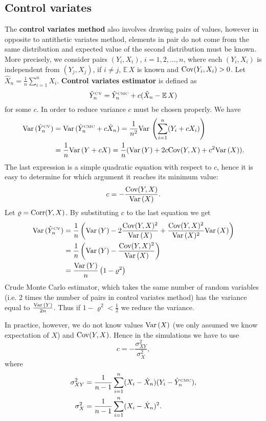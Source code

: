 \documentclass[a4paper,12pt, oneside]{book}
\theoremstyle{definition}
\theoremstyle{remark}
\def\Var{{\rm Var}\,}
\def\E{{\mathbb{E}}\,}
\def\Cov{{\hbox{Cov}}}
\def\Corr{{\hbox{Corr}}}
\def\CMC[#1]{\hat{Y}^{\hbox{\tiny CMC}}_{#1}}
\def\CV[#1]{\hat{Y}^{\hbox{\tiny CV}}_{#1}}
\begin{document}
\subsection{Control variates}
The \textbf{control variates method} also involves drawing pairs of values, however in opposite to antithetic variates method, elements in pair do not come from the same distribution and expected value of the second distribution must be known. More precisely, we consider pairs $(Y_i, X_i)$, $i=1,2,...,n$, where each $(Y_i, X_i)$ is independent from $(Y_j, X_j)$, if $i \neq j$, $\E X$ is known and $\Cov(Y_i, X_i) > 0$. Let $\hat{X}_n = \frac{1}{n}\sum_{i=1}^n X_i$. \textbf{Control variates estimator} is defined as
\begin{equation}
 \label{eq:CV}
 \CV[n] = \CMC[n] + c(\hat{X}_n - \E X)
\end{equation}
for some $c$. In order to reduce variance $c$ must be chosen properly. We have
\begin{equation*}
 \begin{split}
 \Var( \CV[n] ) &= \Var( \CMC[n] + c\hat{X}_n ) = \frac{1}{n^2} \Var \left( \sum\limits_{i=1}^n( Y_i + c X_i) \right) \\
                &= \frac{1}{n}\Var(Y + c X) = \frac{1}{n}( \Var(Y) + 2c\Cov(Y,X) + c^2 \Var(X)).
 \end{split}
\end{equation*}
The last expression is a simple quadratic equation with respect to $c$, hence it is easy to determine for which argument it reaches its minimum value:
\[ c = -\frac{\Cov(Y,X)}{\Var(X)}. \]
Let $\varrho = \Corr(Y,X)$. By substituting $c$ to the last equation we get
\begin{equation}
 \begin{split}
 \Var( \CV[n] ) &=  \frac{1}{n} \left( \Var(Y) - 2\frac{\Cov(Y,X)^2}{\Var(X)} + \frac{\Cov(Y,X)^2}{\Var(X)^2} \Var(X) \right) \\
 &= \frac{1}{n} \left( \Var(Y) - \frac{\Cov(Y,X)^2}{\Var(X)}  \right) \\
 &= \frac{\Var(Y)}{n} \left( 1 - \varrho^2  \right) \label{eq:VarCV}
 \end{split}
\end{equation}
Crude Monte Carlo estimator, which takes the same number of random variables (i.e. 2 times the number of pairs in control variates method) has the variance equal to $\frac{\Var(Y)}{2n}$. Thus if $1 - \varrho^2 < \frac{1}{2}$ we reduce the variance.

In practice, however, we do not know values $\Var(X)$ (we only assumed we know expectation of $X$) and $\Cov(Y,X)$. Hence in the simulations we have to use 
\begin{equation}
 \label{eq:CVc}
 c = -\frac{\sigma_{XY}^2}{\sigma_{X}^2},
\end{equation}
where
\begin{equation*}
 \begin{split}
  \sigma_{XY}^2 &= \frac{1}{n-1} \sum\limits_{i=1}^{n} (X_i - \hat{X}_n)(Y_i - \CMC[n]),\\
  \sigma_{X}^2 &= \frac{1}{n-1} \sum\limits_{i=1}^{n} (X_i - \hat{X}_n)^2.
 \end{split}
\end{equation*}
\end{document}
